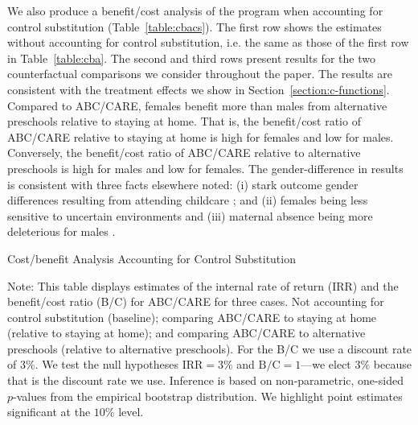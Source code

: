 We also produce a benefit/cost analysis of the program when accounting for control substitution (Table~\ref{table:cbacs}). The first row shows the estimates without accounting for control substitution, i.e. the same as those of the first row in Table~\ref{table:cba}. The second and third rows present results for the two counterfactual comparisons we consider throughout the paper. The results are consistent with the treatment effects we show in Section~\ref{section:c-functions}. Compared to ABC/CARE, females benefit more than males from alternative preschools relative to staying at home. That is, the benefit/cost ratio of ABC/CARE relative to staying at home is high for females and low for males. Conversely, the benefit/cost ratio of ABC/CARE relative to alternative preschools is high for males and low for females. The gender-difference in results is consistent with three facts elsewhere noted: (i) stark outcome gender differences resulting from attending childcare \citep{Kottelenberg-Lehrer_2014_Gender-Effects,Baker_Gruber_Milligan_2015_Noncog_Defects,Doyle-etal_2015_Econ-Hum-Bio,Doyle-etal_2016_PLoS-ONE}; and (ii) females being less sensitive to uncertain environments \citep{Autor-etal_2015_Family-Disadvantage} and (iii) maternal absence being more deleterious for males \citep{Rutter_1972_Maternal-Deprivation}.

\begin{table}[!htbp]
\begin{threeparttable}
\caption{Cost/benefit Analysis Accounting for Control Substitution}
\label{table:cbacs}
\centering

\begin{tablenotes}
\footnotesize
\item Note: This table displays estimates of the internal rate of return (IRR) and the benefit/cost ratio (B/C) for ABC/CARE for three cases. Not accounting for control substitution (baseline); comparing ABC/CARE to staying at home (relative to staying at home); and comparing ABC/CARE to alternative preschools (relative to alternative preschools). For the B/C we use a discount rate of $3\%$. We test the null hypotheses $\text{IRR} = 3\%$ and $\text{B/C} = 1$---we elect $3\%$ because that is the discount rate we use. Inference is based on non-parametric, one-sided $p$-values from the empirical bootstrap distribution. We highlight point estimates significant at the $10\%$ level.
\end{tablenotes}
\end{threeparttable}
\end{table}

